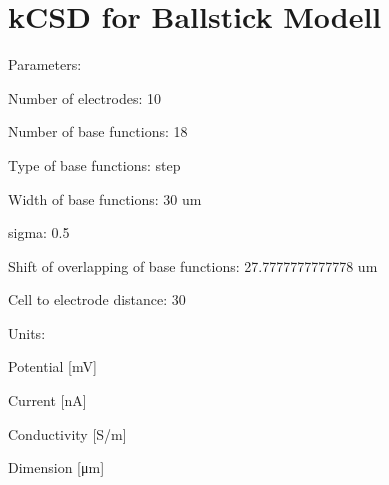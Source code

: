 \documentclass[10pt,a4paper]{report}
\author{Dorottya Cserpan}
\begin{document}
\section{kCSD for Ballstick Modell}




Parameters:

\begin{Schunk}
\begin{Soutput}
Number of electrodes: 10
\end{Soutput}
\begin{Soutput}
Number of base functions: 18
\end{Soutput}
\begin{Soutput}
Type of base functions: step
\end{Soutput}
\begin{Soutput}
Width of base functions: 30 um
\end{Soutput}
\begin{Soutput}
sigma: 0.5
\end{Soutput}
\begin{Soutput}
Shift of overlapping of base functions: 27.7777777777778 um
\end{Soutput}
\begin{Soutput}
Cell to electrode distance: 30
\end{Soutput}
\end{Schunk}

Units:
\begin{Schunk}
\begin{Soutput}
Potential 	  [mV]
\end{Soutput}
\begin{Soutput}
Current      [nA]
\end{Soutput}
\begin{Soutput}
Conductivity [S/m]
\end{Soutput}
\begin{Soutput}
Dimension 	  [μm]
\end{Soutput}
\end{Schunk}
\end{document}
